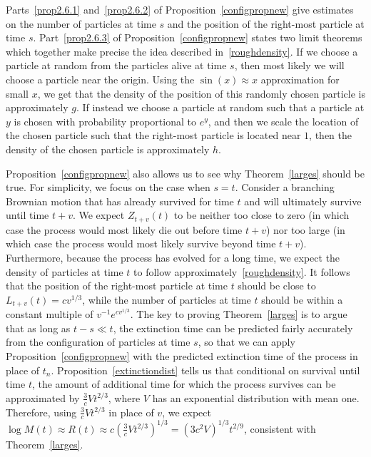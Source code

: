 \documentclass[AHL,Unicode,longabstracts,published]{cedram}
\newcommand{\1} {\mathds{1}}
\begin{document}
\begin{rema}
Parts~\eqref{prop2.6.1} and~\eqref{prop2.6.2} of Proposition~\ref{configpropnew} give estimates on the number of particles at time $s$ and the position of the right-most particle at time $s$. Part~\eqref{prop2.6.3} of Proposition~\ref{configpropnew} states two limit theorems which together make precise the idea described in~\eqref{roughdensity}. If we choose a particle at random from the particles alive at time $s$, then most likely we will choose a particle near the origin. Using the $\sin(x) \approx x$ approximation for small $x$, we get that the density of the position of this randomly chosen particle is approximately $g$. If instead we choose a particle at random such that a particle at $y$ is chosen with probability proportional to $e^y$, and then we scale the location of the chosen particle such that the right-most particle is located near $1$, then the density of the chosen particle is approximately $h$.
\end{rema}

\begin{rema}
Proposition~\ref{configpropnew} also allows us to see why Theorem~\ref{larges} should be true. For simplicity, we focus on the case when $s = t$. Consider a branching Brownian motion that has already survived for time $t$ and will ultimately survive until time $t + v$. We expect $Z_{t+v}(t)$ to be neither too close to zero (in which case the process would most likely die out before time $t + v$) nor too large (in which case the process would most likely survive beyond time $t + v$). Furthermore, because the process has evolved for a long time, we expect the density of particles at time $t$ to follow approximately~\eqref{roughdensity}. It follows that the position of the right-most particle at time $t$ should be close to $L_{t+v}(t) = cv^{1/3}$, while the number of particles at time $t$ should be within a constant multiple of $v^{-1} e^{cv^{1/3}}$. The key to proving Theorem~\ref{larges} is to argue that as long as $t - s \ll t$, the extinction time can be predicted fairly accurately from the configuration of particles at time $s$, so that we can apply Proposition~\ref{configpropnew} with the predicted extinction time of the process in place of $t_n$. Proposition~\ref{extinctiondist} tells us that conditional on survival until time $t$, the amount of additional time for which the process survives can be approximated by $\frac{3}{c}V t^{2/3}$, where $V$ has an exponential distribution with mean one. Therefore, using $\frac{3}{c}Vt^{2/3}$ in place of $v$, we expect $\log M(t) \approx R(t) \approx c(\frac{3}{c} V t^{2/3})^{1/3} = (3c^2 V)^{1/3} t^{2/9}$, consistent with Theorem~\ref{larges}.
\end{rema}
\end{document}
